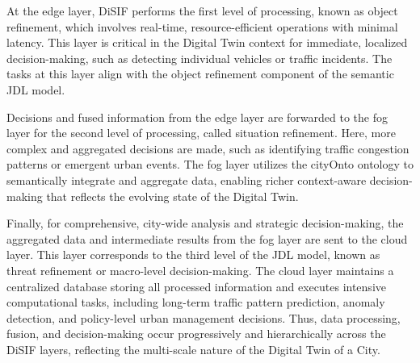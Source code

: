 \documentclass[5p,times]{elsarticle}
\begin{document}
At the edge layer, DiSIF performs the first level of processing,
 known as object refinement, which involves real-time, resource-efficient operations with minimal
  latency. This layer is critical in the Digital Twin context for immediate, 
  localized decision-making, such as detecting individual vehicles or traffic incidents.
   The tasks at this layer align with the object refinement component of the semantic JDL model.

Decisions and fused information from the edge layer are forwarded to 
the fog layer for the second level of processing, called situation refinement.
 Here, more complex and aggregated decisions are made, such as identifying traffic
  congestion patterns or emergent urban events. The fog layer utilizes the cityOnto ontology
   to semantically integrate and aggregate data, enabling richer context-aware decision-making 
   that reflects the evolving state of the Digital Twin.

Finally, for comprehensive, city-wide analysis and strategic decision-making, 
the aggregated data and intermediate results from the fog layer are sent to the cloud layer.
 This layer corresponds to the third level of the JDL model, known as threat refinement
  or macro-level decision-making. The cloud layer maintains a centralized database storing all
   processed information and executes intensive computational tasks, including long-term traffic
    pattern prediction, anomaly detection, and policy-level urban management decisions.
     Thus, data processing, fusion, and decision-making occur progressively and hierarchically 
     across the DiSIF layers, reflecting the multi-scale nature of the Digital Twin of a City.











\end{document}
